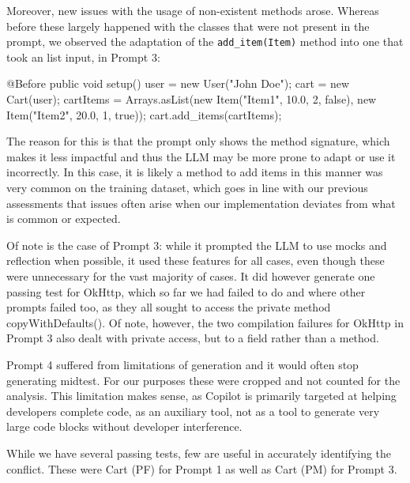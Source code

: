 Moreover, new issues with the usage of non-existent methods arose. Whereas before these largely happened with the classes that were not present
in the prompt, we observed the adaptation of the \texttt{add\_item(Item)} method into one that took an list input, in Prompt 3:
\begin{response}
    @Before
    public void setup() {
        user = new User("John Doe");
        cart = new Cart(user);
        cartItems = Arrays.asList(new Item("Item1", 10.0, 2, false),
                                  new Item("Item2", 20.0, 1, true));
        cart.add_items(cartItems);
    }
\end{response}
The reason for this is that the prompt only shows the method signature, which makes it less impactful and thus the LLM may be
more prone to adapt or use it incorrectly. In this case, it is likely a method to add items in this manner was very common on the training dataset,
which goes in line with our previous assessments that issues often arise when our implementation deviates from what is common or expected.

Of note is the case of Prompt 3: while it prompted the LLM to use mocks and reflection when possible, it used these features
for all cases, even though these were unnecessary for the vast majority of cases. It did however generate one passing test for OkHttp,
which so far we had failed to do and where other prompts failed too, as they all sought to access the private method copyWithDefaults().
Of note, however, the two compilation failures for OkHttp in Prompt 3 also dealt with private access, but to a field rather than a method.

Prompt 4 suffered from limitations of generation and it would often stop generating midtest. For our purposes these were cropped and not counted for the analysis.
This limitation makes sense, as Copilot is primarily targeted at helping developers complete code, as an auxiliary tool, not as a tool to generate very large
code blocks without developer interference.

While we have several passing tests, few are useful in accurately identifying the conflict.
These were Cart (PF) for Prompt 1 as well as Cart (PM) for Prompt 3.



